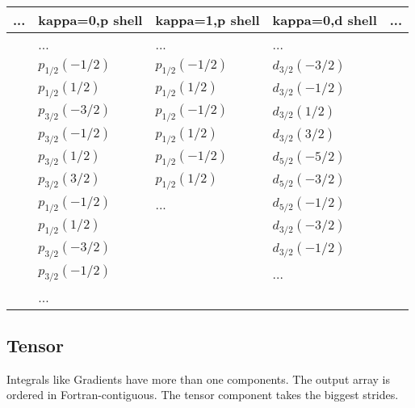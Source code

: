 \documentclass[]{article}
\begin{document}
\begin{itemize}
  \begin{tabular}{l|l|l|l|l}
  \hline
      ... & kappa=0,p shell & kappa=1,p shell & kappa=0,d shell & ... \\
  \hline
          & ...             & ...             & ...             &     \\
          & $p_{1/2}(-1/2)$ & $p_{1/2}(-1/2)$ & $d_{3/2}(-3/2)$ &     \\
          & $p_{1/2}( 1/2)$ & $p_{1/2}( 1/2)$ & $d_{3/2}(-1/2)$ &     \\
          & $p_{3/2}(-3/2)$ & $p_{1/2}(-1/2)$ & $d_{3/2}( 1/2)$ &     \\
          & $p_{3/2}(-1/2)$ & $p_{1/2}( 1/2)$ & $d_{3/2}( 3/2)$ &     \\
          & $p_{3/2}( 1/2)$ & $p_{1/2}(-1/2)$ & $d_{5/2}(-5/2)$ &     \\
          & $p_{3/2}( 3/2)$ & $p_{1/2}( 1/2)$ & $d_{5/2}(-3/2)$ &     \\
          & $p_{1/2}(-1/2)$ & ...             & $d_{5/2}(-1/2)$ &     \\
          & $p_{1/2}( 1/2)$ &                 & $d_{3/2}(-3/2)$ &     \\
          & $p_{3/2}(-3/2)$ &                 & $d_{3/2}(-1/2)$ &     \\
          & $p_{3/2}(-1/2)$ &                 & ...             &     \\
          & ...             &                 &                 &     \\
  \hline
  \end{tabular}
\end{itemize}

\subsection{Tensor}\label{tensor}

Integrals like Gradients have more than one components. The output array
is ordered in Fortran-contiguous. The tensor component takes the biggest
strides.
\end{document}
